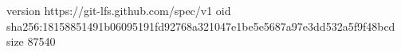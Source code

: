 version https://git-lfs.github.com/spec/v1
oid sha256:18158851491b06095191fd92768a321047e1be5e5687a97e3dd532a5f9f48bcd
size 87540
